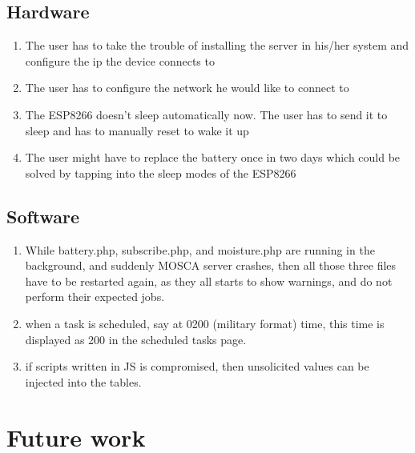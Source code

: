 \documentclass[16pt]{article}
\begin{document}
\vspace{0.5cm}

\subsection{Hardware}
\begin{enumerate}
 \item The user has to take the trouble of installing the server in his/her system and configure the ip the device connects to
 \item The user has to configure the network he would like to connect to 
 \item The ESP8266 doesn't sleep automatically now. The user has to send it to sleep and has to manually reset to wake it up
 \item The user might have to replace the battery once in two days which could be solved by tapping into the sleep modes of the ESP8266
\end{enumerate}

\vspace{0.5cm}

\subsection{Software}
\begin{enumerate}
 \item While battery.php, subscribe.php, and moisture.php are running in the background, and suddenly MOSCA server crashes, then all those three files have to be restarted again, as they all starts to show warnings, and do not perform their expected jobs.
 \item when a task is scheduled, say at 0200 (military format) time, this time is displayed as 200 in the scheduled tasks page.
 \item if scripts written in JS is compromised, then unsolicited values can be injected into the tables.
\end{enumerate}


\vspace{19cm}

\section{Future work}

\vspace{0.5cm}
\end{document}
